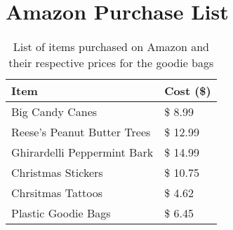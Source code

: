 \section{Amazon Purchase List}
\label{appendix:amazon}

\begin{table}[H]
	\centering
	\caption{List of items purchased on Amazon and their respective prices for the goodie bags}
	\begin{tabular}{l|l}
	\textbf{Item}               & \textbf{Cost (\$)} \\ \hline
	Big Candy Canes             & \$    8.99         \\
	Reese's Peanut Butter Trees & \$  12.99          \\
	Ghirardelli Peppermint Bark & \$  14.99          \\
	Christmas Stickers          & \$  10.75          \\
	Chrsitmas Tattoos           & \$    4.62         \\
	Plastic Goodie Bags         & \$    6.45
	\end{tabular}
	\label{tab:amazon}
\end{table}
